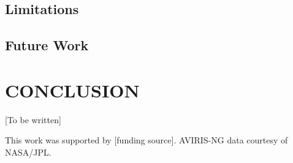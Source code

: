 \documentclass[]{spieman}
\begin{document}
\subsection{Limitations}

\subsection{Future Work}

\section{CONCLUSION}
\label{sec:conclusion}

[To be written]

\acknowledgments

This work was supported by [funding source]. AVIRIS-NG data courtesy of NASA/JPL.



\end{document}
